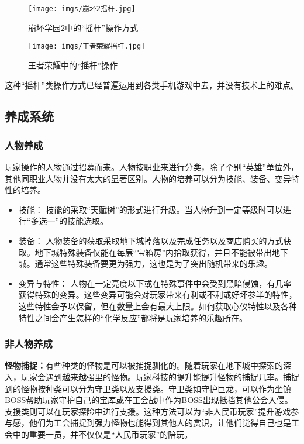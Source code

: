 \documentclass[UTF8,AutoFakeBold=1,AutoFakeSlant,zihao=-4]{cucthesis}
\begin{document}
\begin{figure}[ht]
    \centering
    \texttt{[image: imgs/崩坏2摇杆.jpg]}    
    \caption{崩坏学园2中的“摇杆”操作方式}
    \label{fig:stick01}
\end{figure}


\begin{figure}[ht]
    \centering  
    \texttt{[image: imgs/王者荣耀摇杆.jpg]}
    \caption{王者荣耀中的“摇杆”操作}
    \label{fig:stick02}
\end{figure}

这种“摇杆”类操作方式已经普遍运用到各类手机游戏中去，并没有技术上的难点。



\subsection{养成系统}

\subsubsection{人物养成}
玩家操作的人物通过招募而来。人物按职业来进行分类，除了个别“英雄”单位外，其他同职业人物并没有太大的显著区别。人物的培养可以分为技能、装备、变异特性的培养。

\begin{itemize}
    \item 技能：
    技能的采取“天赋树”的形式进行升级。当人物升到一定等级时可以进行“多选一”的技能选取。
    \item 装备：
    人物装备的获取采取地下城掉落以及完成任务以及商店购买的方式获取。地下城特殊装备仅能在每层“宝箱房”内拾取获得，并且不能被带出地下城。通常这些特殊装备要更为强力，这也是为了突出随机带来的乐趣。
    \item 变异与特性：
    人物在一定亮度以下或在特殊事件中会受到黑暗侵蚀，有几率获得特殊的变异。这些变异可能会对玩家带来有利或不利或好坏参半的特性，这些特性会予以保留，但在数量上会有最大上限。如何获取心仪特性以及各种特性之间会产生怎样的“化学反应”都将是玩家培养的乐趣所在。
\end{itemize}



\subsubsection{非人物养成}


\textbf{怪物捕捉：}有些种类的怪物是可以被捕捉驯化的。随着玩家在地下城中探索的深入，玩家会遇到越来越强里的怪物。玩家科技的提升能提升怪物的捕捉几率。捕捉到的怪物按种类可以分为守卫类以及支援类。守卫类如守护巨龙，可以作为坐镇BOSS帮助玩家守护自己的宝库或在工会战中作为BOSS出现抵挡其他公会入侵。支援类则可以在玩家探险中进行支援。这种方法可以为“非人民币玩家”提升游戏参与感，他们为工会捕捉到强力怪物也能得到其他人的赏识，让他们觉得自己也是工会中的重要一员，并不仅仅是“人民币玩家”的陪玩。
\end{document}
